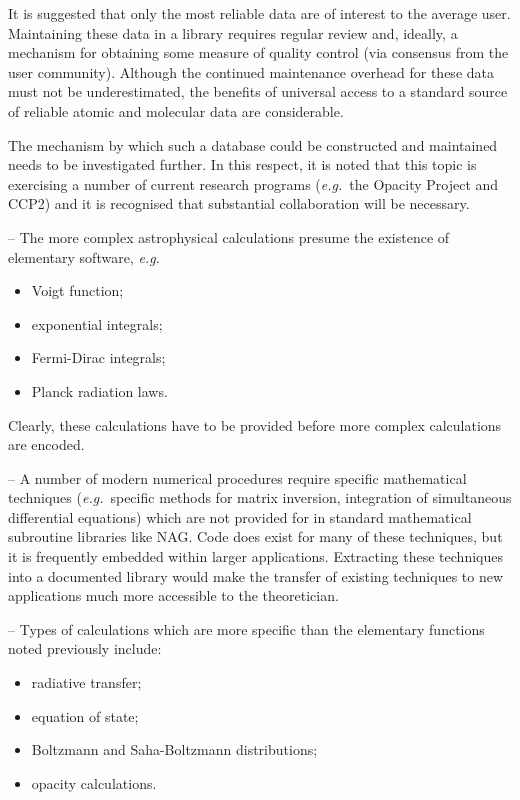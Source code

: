 \begin {description}
It is suggested that only the most reliable data are of interest to the
average user.
Maintaining these data in a library requires regular review
and, ideally, a mechanism for obtaining some measure of quality control
(via consensus from the user community).
Although the continued maintenance overhead for these data must not be
underestimated, the benefits of universal access to a standard source of
reliable atomic and molecular data are considerable.

The mechanism by which such a database could be constructed and maintained
needs to be investigated further.
In this respect, it is noted that this topic is exercising a
number of current research programs ({\em e.g.}\ the Opacity Project and CCP2)
and it is recognised that substantial collaboration will be necessary.

\item [Elementary functions] -- The more complex astrophysical calculations
presume the existence of elementary software, {\em e.g.}

\begin {itemize}
\item Voigt function;
\item exponential integrals;
\item Fermi-Dirac integrals;
\item Planck radiation laws.
\end {itemize}

Clearly, these calculations have to be provided before more complex
calculations are encoded.

\item [Mathematical techniques] -- A number of modern numerical procedures
require specific mathematical techniques ({\em e.g.}\ specific methods for
matrix inversion, integration of simultaneous differential equations)
which are not provided for in standard mathematical subroutine libraries
like NAG.
Code does exist for many of these techniques, but it is frequently embedded
within larger applications.
Extracting these techniques into a documented library would make the
transfer of existing techniques to new applications much more accessible to
the theoretician.

\item [Simple applications] -- Types of calculations which are more specific
than the elementary functions noted previously include:

\begin {itemize}
\item radiative transfer;
\item equation of state;
\item Boltzmann and Saha-Boltzmann distributions;
\item opacity calculations.
\end {itemize}


\end{description}
